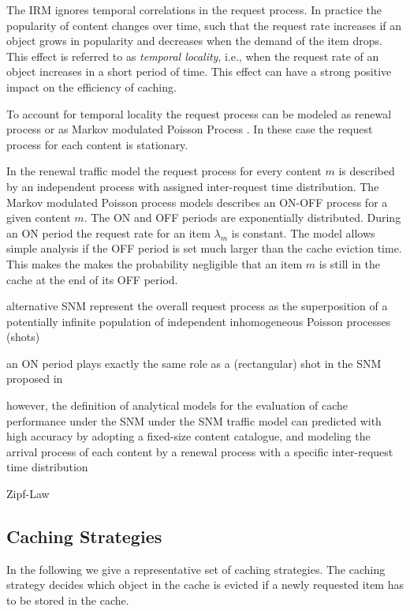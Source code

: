 The IRM ignores temporal correlations in the request process.
In practice the popularity of content changes over time, such that the request rate increases if an object grows in popularity and decreases when the demand of the item drops. This effect is referred to as \textit{temporal locality}, i.e., when the request rate of an object increases in a short period of time.
This effect can have a strong positive impact on the efficiency of caching.

To account for temporal locality the request process can be modeled as renewal process \cite{martina2014unified} or as Markov modulated Poisson Process \cite{garetto2014dynamic}.
In these case the request process for each content is stationary.

In the renewal traffic model the request process for every content $m$ is described by an independent process with assigned inter-request time distribution.
The Markov modulated Poisson process models describes an ON-OFF process for a given content $m$.
The ON and OFF periods are exponentially distributed.
During an ON period the request rate for an item $\lambda_m$ is constant.
The model allows simple analysis if the OFF period is set much larger than the cache eviction time.
This makes the makes the probability negligible that an item $m$ is still in the cache at the end of its OFF period.

alternative SNM \cite{traverso2013temporal}
represent the overall request process as the superposition of a potentially infinite population of independent inhomogeneous Poisson processes (shots)

an ON
period  plays  exactly  the  same  role  as  a  (rectangular) shot  in
the SNM proposed in

however, the definition of analytical models for the evaluation of cache performance under the SNM
under the SNM traffic model can predicted with high accuracy by adopting a fixed-size content catalogue, and modeling the arrival process of each content by a renewal process with a specific inter-request time distribution

Zipf-Law

\subsection{Caching Strategies}

In the following we give a representative set of caching strategies.
The caching strategy decides which object in the cache is evicted if a newly requested item has to be stored in the cache.

